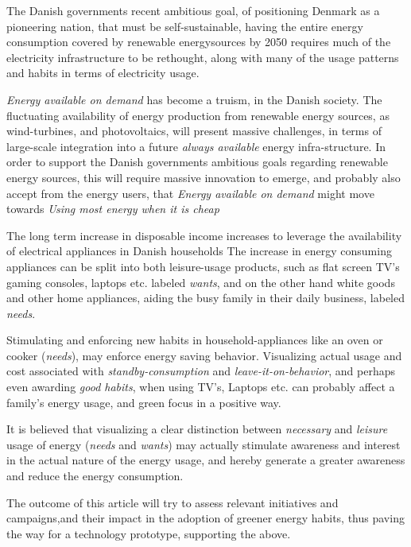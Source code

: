 \documentclass[journal]{IEEEtran}
\begin{document}
The Danish governments recent ambitious goal, of positioning Denmark as a pioneering nation, that must be self-sustainable, having the entire energy consumption covered by renewable energysources by 2050 \cite{energipolitik_2020} requires much of the electricity infrastructure to be rethought, along with many of the usage patterns and habits in terms of electricity usage.

\textit{Energy available on demand} has become a truism, in the Danish society. The fluctuating availability of energy production from renewable energy sources, as wind-turbines, and photovoltaics, will present massive challenges, in terms of large-scale  integration into a future \textit{always available} energy infra-structure. In order to support the Danish governments ambitious goals regarding renewable energy sources, this will require massive innovation to emerge, and probably also accept from the energy users, that \textit{Energy available on demand} might move towards \textit{Using most energy when it is cheap}   

The long term increase in disposable income increases to leverage the availability of electrical appliances in Danish households %
The increase in energy consuming appliances can be split into both leisure-usage products, such as flat screen TV's gaming consoles, laptops etc. labeled \textit{wants}, and on the other hand white goods and other home appliances, aiding the busy family in their daily business, labeled \textit{needs}.

Stimulating and enforcing new habits in household-appliances like an oven or cooker (\textit{needs}), may enforce energy saving behavior. 
Visualizing actual usage and cost associated with \textit{standby-consumption} and \textit{leave-it-on-behavior}, and perhaps even awarding \textit{good habits}, when using TV's, Laptops etc. can probably affect a family's energy usage, and green focus in a positive way.

It is believed that visualizing a clear distinction between \textit{necessary} and \textit{leisure} usage of energy (\textit{needs} and \textit{wants}) may actually stimulate awareness and interest in the actual nature of the energy usage, and hereby generate a greater awareness and reduce the energy consumption.

The outcome of this article will try to assess relevant initiatives and campaigns,and their impact in the adoption of greener energy habits, thus paving the way for a technology prototype, supporting the above.
\end{document}
